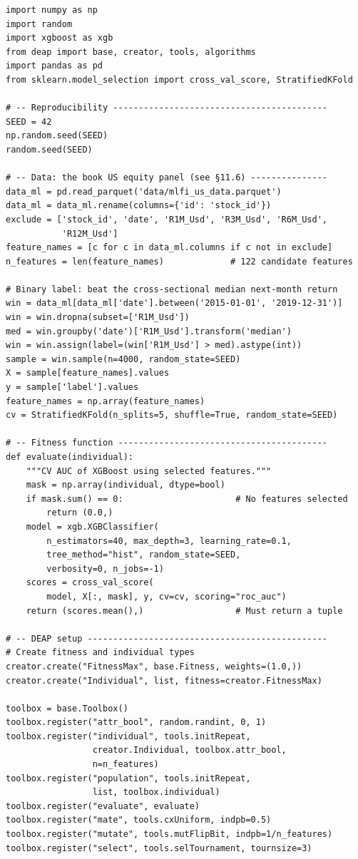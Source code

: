 \begin{verbatim}
import numpy as np
import random
import xgboost as xgb
from deap import base, creator, tools, algorithms
import pandas as pd
from sklearn.model_selection import cross_val_score, StratifiedKFold

# -- Reproducibility ------------------------------------------
SEED = 42
np.random.seed(SEED)
random.seed(SEED)

# -- Data: the book US equity panel (see §11.6) ---------------
data_ml = pd.read_parquet('data/mlfi_us_data.parquet')
data_ml = data_ml.rename(columns={'id': 'stock_id'})
exclude = ['stock_id', 'date', 'R1M_Usd', 'R3M_Usd', 'R6M_Usd',
           'R12M_Usd']
feature_names = [c for c in data_ml.columns if c not in exclude]
n_features = len(feature_names)             # 122 candidate features

# Binary label: beat the cross-sectional median next-month return
win = data_ml[data_ml['date'].between('2015-01-01', '2019-12-31')]
win = win.dropna(subset=['R1M_Usd'])
med = win.groupby('date')['R1M_Usd'].transform('median')
win = win.assign(label=(win['R1M_Usd'] > med).astype(int))
sample = win.sample(n=4000, random_state=SEED)
X = sample[feature_names].values
y = sample['label'].values
feature_names = np.array(feature_names)
cv = StratifiedKFold(n_splits=5, shuffle=True, random_state=SEED)

# -- Fitness function -----------------------------------------
def evaluate(individual):
    """CV AUC of XGBoost using selected features."""
    mask = np.array(individual, dtype=bool)
    if mask.sum() == 0:                      # No features selected
        return (0.0,)
    model = xgb.XGBClassifier(
        n_estimators=40, max_depth=3, learning_rate=0.1,
        tree_method="hist", random_state=SEED,
        verbosity=0, n_jobs=-1)
    scores = cross_val_score(
        model, X[:, mask], y, cv=cv, scoring="roc_auc")
    return (scores.mean(),)                  # Must return a tuple

# -- DEAP setup -----------------------------------------------
# Create fitness and individual types
creator.create("FitnessMax", base.Fitness, weights=(1.0,))
creator.create("Individual", list, fitness=creator.FitnessMax)

toolbox = base.Toolbox()
toolbox.register("attr_bool", random.randint, 0, 1)
toolbox.register("individual", tools.initRepeat,
                 creator.Individual, toolbox.attr_bool,
                 n=n_features)
toolbox.register("population", tools.initRepeat,
                 list, toolbox.individual)
toolbox.register("evaluate", evaluate)
toolbox.register("mate", tools.cxUniform, indpb=0.5)
toolbox.register("mutate", tools.mutFlipBit, indpb=1/n_features)
toolbox.register("select", tools.selTournament, tournsize=3)


\end{verbatim}
